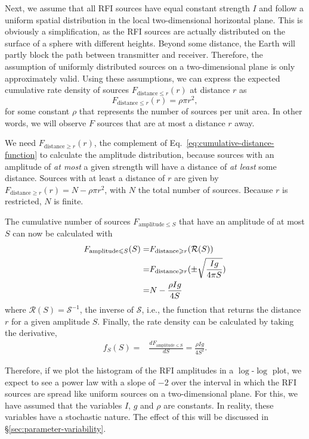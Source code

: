 \documentclass[useAMS,usenatbib]{mn2e}
\begin{document}
Next, we assume that all RFI sources have equal constant strength $I$ and follow a uniform spatial distribution in the local two-dimensional horizontal plane. This is obviously a simplification, as the RFI sources are actually distributed on the surface of a sphere with different heights. Beyond some distance, the Earth will partly block the path between transmitter and receiver. Therefore, the assumption of uniformly distributed sources on a two-dimensional plane is only approximately valid. Using these assumptions, we can express the expected cumulative rate density of sources $F_{\textrm{distance} \le r}(r)$ at distance $r$ as
\begin{equation} \label{eq:cumulative-distance-function}
F_{\textrm{distance} \le r}(r)=\rho \pi r^2,
\end{equation}
for some constant $\rho$ that represents the number of sources per unit area. In other words, we will observe $F$ sources that are at most a distance $r$ away.

We need $F_{\textrm{distance} \ge r}(r)$, the complement of Eq.~\eqref{eq:cumulative-distance-function} to calculate the amplitude distribution, because sources with an amplitude of \emph{at most} a given strength will have a distance of \emph{at least} some distance. Sources with at least a distance of $r$ are given by $F_{\textrm{distance} \ge r}(r) = N - \rho \pi r^2$, with $N$ the total number of sources. Because $r$ is restricted, $N$ is finite.

The cumulative number of sources $F_{\textrm{amplitude} \le S}$ that have an amplitude of at most $S$ can now be calculated with
\begin{align} \label{eq:cumulative-rfi-distribution}
 F_{\textrm{amplitude} \le S}(S) = & F_{\textrm{distance} \ge r}(\mathcal{R}(S))\\
\notag = & F_{\textrm{distance} \ge r}(\pm\sqrt\frac{Ig}{4\pi S})\\
\notag = & N-\frac{\rho Ig}{4S}
\end{align}
where $\mathcal{R}(S)=\mathcal{S}^{-1}$, the inverse of $\mathcal{S}$, i.e., the function that returns the distance $r$ for a given amplitude $S$. Finally, the rate density can be calculated by taking the derivative,
\begin{align} \label{eq:two-dimensional-distribution}
 f_S(S) = & \frac{dF_{\textrm{amplitude} \le S}}{dS} = \frac{\rho Ig}{4S^2}.
\end{align}

Therefore, if we plot the histogram of the RFI amplitudes in a $\log$-$\log$ plot, we expect to see a power law with a slope of $-2$ over the interval in which the RFI sources are spread like uniform sources on a two-dimensional plane. For this, we have assumed that the variables $I$, $g$ and $\rho$ are constants. In reality, these variables have a stochastic nature. The effect of this will be discussed in \S\ref{sec:parameter-variability}.
\end{document}
